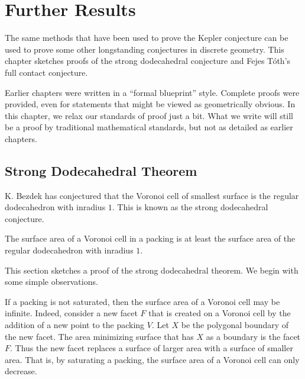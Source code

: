 
\chapter{Further Results}


The same methods that have been used to prove the Kepler conjecture can
be used to prove some other longstanding conjectures in discrete geometry.
This chapter sketches proofs of the strong dodecahedral conjecture and Fejes T\'oth's
full contact conjecture.

Earlier chapters were written in a ``formal blueprint'' style.   Complete proofs
were provided, even for statements that might be viewed as geometrically obvious.  In
this chapter, we relax our standards of proof just a bit.  What we write will still be a
proof by traditional mathematical standards, but not as detailed as earlier chapters.

\section{Strong Dodecahedral Theorem}

K. Bezdek has conjectured that the Voronoi cell of smallest surface is
the regular dodecahedron with inradius $1$.  This is known as the
strong dodecahedral conjecture.  %
%


\begin{theorem}
  The surface area of a Voronoi cell in a packing is at least the
  surface area of the regular dodecahedron with inradius $1$.
\end{theorem}

This section sketches a proof of the strong dodecahedral theorem.  We
begin with some simple observations.

\begin{remark}
  If a packing is not saturated, then the surface area of a Voronoi
  cell may be infinite.  
  Indeed, consider a new facet $F$ that is created on a Voronoi cell
  by the addition of a new point to the packing $V$.  Let $X$ be the
  polygonal boundary of the new facet.  The area minimizing surface
  that has $X$ as a boundary is the facet $F$.  Thus the new facet
  replaces a surface of larger area with a surface of smaller area.
  That is, by saturating a packing, the surface area of a Voronoi cell
  can only decrease.
\end{remark}



